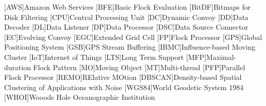 \begin{acronym}[ACRONYM]
[AWS]{Amazon Web Services}
[BFE]{Basic Flock Evaluation}
[BitDF]{Bitmaps for Disk Filtering}
[CPU]{Central Processing Unit}
[DC]{Dynamic Convoy}
[DD]{Data Decoder}
[DL]{Data Listener}
[DP]{Data Processor}
[DSC]{Data Source Connector}
[EC]{Evolving Convoy}
[EGC]{Extended Grid Cell}
[FP]{Flock Processor}
[GPS]{Global Positioning System}
[GSB]{GPS Stream Buffering}
[IBMC]{Influence-based Moving Cluster}
[IoT]{Internet of Things}
[LTS]{Long Term Support}
[MFP]{Maximal-duration Flock Pattern}
[MO]{Moving Object}
[MT]{Multi-thread}
[PFP]{Parallel Flock Processor}
[REMO]{RElative MOtion}
[DBSCAN]{Density-based Spatial Clustering of Applications with Noise}
[WGS84]{World Geodetic System 1984}
[WHOI]{Wooods Hole Oceanographic Institution}
\end{acronym}
